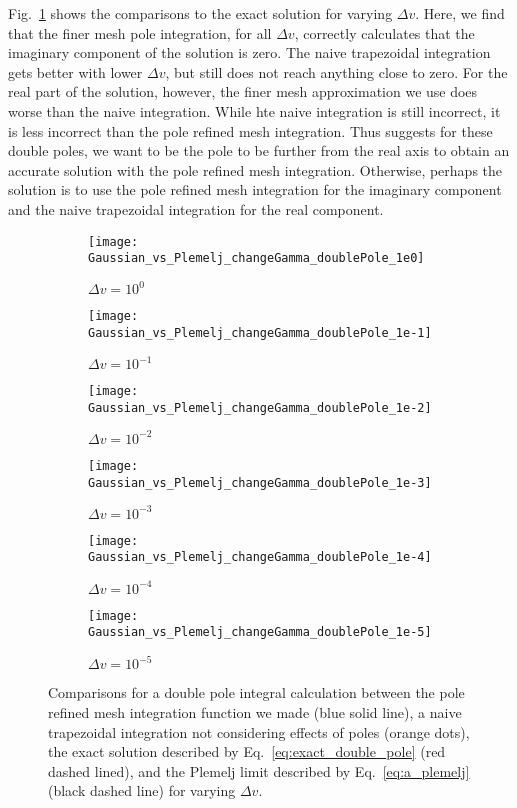 Fig.~\ref{f:double_pole_comparison} shows the comparisons to the exact solution for varying $\Delta v$.
Here, we find that the finer mesh pole integration, for all $\Delta v$, correctly calculates that the 
imaginary component of the solution is zero.
The naive trapezoidal integration gets better with lower $\Delta v$, but still does not reach anything close to zero.
For the real part of the solution, however, the finer mesh approximation we use does worse 
than the naive integration. While hte naive integration is still incorrect, it is less incorrect than the pole refined mesh integration.
Thus suggests for these double poles, we want to be the pole to be further from the real axis to obtain an accurate solution
with the pole refined mesh integration. 
Otherwise, perhaps the solution is to use the pole refined mesh integration for the imaginary component and the naive trapezoidal integration for the real component.


\begin{figure}[!htb]
	\centering
	\begin{subfigure}{.32\textwidth}
		\texttt{[image: Gaussian\_vs\_Plemelj\_changeGamma\_doublePole\_1e0]}
		\caption{$\Delta v = 10^0$}
	\end{subfigure}
	\begin{subfigure}{.32\textwidth}
		\texttt{[image: Gaussian\_vs\_Plemelj\_changeGamma\_doublePole\_1e-1]}
		\caption{$\Delta v = 10^{-1}$}
	\end{subfigure}
	\begin{subfigure}{.32\textwidth}
		\texttt{[image: Gaussian\_vs\_Plemelj\_changeGamma\_doublePole\_1e-2]}
		\caption{$\Delta v = 10^{-2}$}
	\end{subfigure}
	\begin{subfigure}{.32\textwidth}
		\texttt{[image: Gaussian\_vs\_Plemelj\_changeGamma\_doublePole\_1e-3]}
		\caption{$\Delta v = 10^{-3}$}
	\end{subfigure}
	\begin{subfigure}{.32\textwidth}
		\texttt{[image: Gaussian\_vs\_Plemelj\_changeGamma\_doublePole\_1e-4]}
		\caption{$\Delta v = 10^{-4}$}
	\end{subfigure}
	\begin{subfigure}{.32\textwidth}
		\texttt{[image: Gaussian\_vs\_Plemelj\_changeGamma\_doublePole\_1e-5]}
		\caption{$\Delta v = 10^{-5}$}
	\end{subfigure}
	\caption{Comparisons for a double pole integral calculation
		between the pole refined mesh integration function we made (blue solid line), %
		a naive trapezoidal integration not considering effects of poles (orange dots), 
		the exact solution described by Eq.~\ref{eq:exact_double_pole} (red dashed lined), 
		and the Plemelj limit described by Eq.~\ref{eq:a_plemelj} (black dashed line)
		for varying $\Delta v$.}
	\label{f:double_pole_comparison}
\end{figure}

